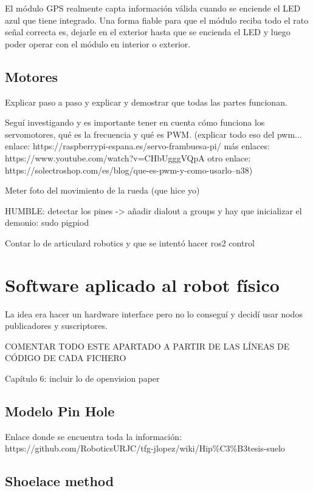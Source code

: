 El módulo GPS realmente capta información válida cuando se enciende el LED azul que tiene integrado. Una forma fiable para que el módulo reciba todo el rato señal correcta es, dejarle en el exterior hasta que se encienda el LED y luego poder operar con el módulo en interior o exterior. 


\subsection{Motores}
\label{subsec:configmotores}


Explicar paso a paso y explicar y demostrar que todas las partes funcionan.

Seguí investigando y es importante tener en cuenta cómo funciona los servomotores, qué es la frecuencia y qué es PWM. (explicar todo eso del pwm... enlace: https://raspberrypi-espana.es/servo-frambuesa-pi/   más enlaces: https://www.youtube.com/watch?v=CHbUgggVQpA   otro enlace: https://solectroshop.com/es/blog/que-es-pwm-y-como-usarlo--n38)

Meter foto del movimiento de la rueda (que hice yo)


HUMBLE: detectar los pines -> añadir dialout a groups y hay que inicializar el demonio: sudo pigpiod

Contar lo de articulard robotics y que se intentó hacer ros2 control

\section{Software aplicado al robot físico}
\label{sec:softwarerf}

La idea era hacer un hardware interface pero no lo conseguí y decidí usar nodos publicadores y suscriptores.

COMENTAR TODO ESTE APARTADO A PARTIR DE LAS LÍNEAS DE CÓDIGO DE CADA FICHERO  




Capítulo 6: incluir lo de openvision paper\\

\subsection{Modelo Pin Hole}
\label{subsec:softwarepinhole}

Enlace donde se encuentra toda la información: https://github.com/RoboticsURJC/tfg-jlopez/wiki/Hip\%C3\%B3tesis-suelo

\subsection{Shoelace method}
\label{subsec:softwareshoelace}




